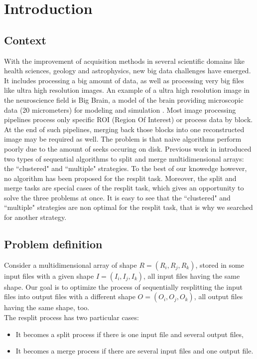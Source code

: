 \documentclass[conference]{IEEEtran}
\begin{document}
\section*{Introduction}

\subsection{Context}

With the improvement of acquisition methods in several scientific domains like health sciences, geology and astrophysics, new big data challenges have emerged. It includes processing a big amount of data, as well as processing very big files like ultra high resolution images. An example of a ultra high resolution image in the neuroscience field is Big Brain, a model of the brain providing microscopic data (20 micrometers) for modeling and simulation \cite{Amunts1472}. Most image processing pipelines process only specific ROI (Region Of Interest) or process data by block. At the end of such pipelines, merging back those blocks into one reconstructed image may be required as well. The problem is that naive algorithms perform poorly due to the amount of seeks occuring on disk\cite{seqalgorithms}. Previous work in \cite{seqalgorithms} introduced two types of sequential algorithms to split and merge multidimensional arrays: the ``clustered" and ``multiple" strategies. To the best of our knowedge however, no algorithm has been proposed for the resplit task. Moreover, the split and merge tasks are special cases of the resplit task, which gives an opportunity to solve the three problems at once. It is easy to see that the ``clustered" and ``multiple" strategies are non optimal for the resplit task, that is why we searched for another strategy.

\subsection{Problem definition}

Consider a multidimensional array of shape $R = (R_i, R_j, R_k)$, stored in some input files with a given shape $I = (I_i, I_j, I_k)$, all input files having the same shape.
Our goal is to optimize the process of sequentially resplitting the input files into output files with a different shape $O = (O_i, O_j, O_k)$, all output files having the same shape, too. \\

The resplit process has two particular cases:
\begin{itemize}
  \item It becomes a split process if there is one input file and several output files,
  \item It becomes a merge process if there are several input files and one output file.
\end{itemize}
\end{document}
